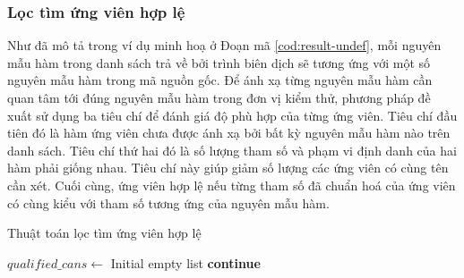 \subsubsection*{Lọc tìm ứng viên hợp lệ}
Như đã mô tả trong ví dụ minh hoạ ở Đoạn mã \autoref{cod:result-undef}, mỗi nguyên mẫu hàm trong danh sách trả về bởi trình biên dịch sẽ tương ứng với một số nguyên mẫu hàm trong mã nguồn gốc. Để ánh xạ từng nguyên mẫu hàm cần quan tâm tới đúng nguyên mẫu hàm trong đơn vị kiểm thử, phương pháp đề xuất sử dụng ba tiêu chí để đánh giá độ phù hợp của từng ứng viên. Tiêu chí đầu tiên đó là hàm ứng viên chưa được ánh xạ bởi bất kỳ nguyên mẫu hàm nào trên danh sách. Tiêu chí thứ hai đó là số lượng tham số và phạm vi định danh của hai hàm phải giống nhau. Tiêu chí này giúp giảm số lượng các ứng viên có cùng tên cần xét. Cuối cùng, ứng viên hợp lệ nếu từng tham số đã chuẩn hoá của ứng viên có cùng kiểu với tham số tương ứng của nguyên mẫu hàm.
\begin{algorithm}
    \small
    \caption{Thuật toán lọc tìm ứng viên hợp lệ}
    \label{alg:filter-undef}
					
    $qualified\_cans \leftarrow$ Initial empty list\;
     {
         {
            \textbf{continue}
        }
    }
\end{algorithm}

